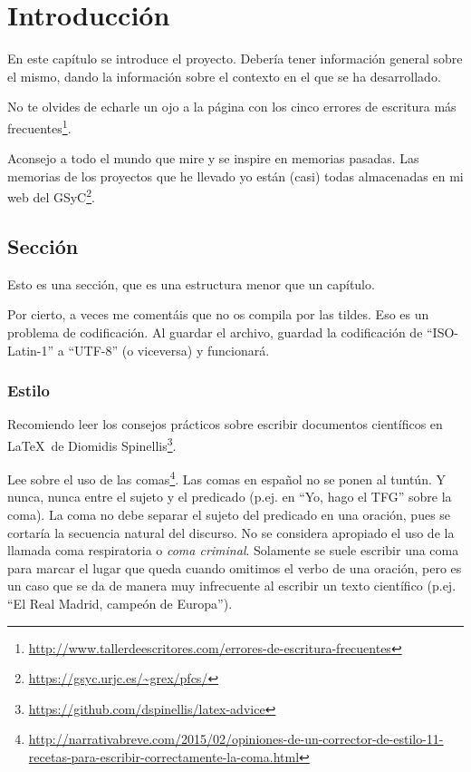 \documentclass[a4paper, 12pt]{book}
\begin{document}

\cleardoublepage
\chapter{Introducción}
\label{sec:intro} %
En este capítulo se introduce el proyecto.
Debería tener información general sobre el mismo, dando la información sobre el contexto en el que se ha desarrollado.

No te olvides de echarle un ojo a la página con los cinco errores de escritura más frecuentes\footnote{\url{http://www.tallerdeescritores.com/errores-de-escritura-frecuentes}}.

Aconsejo a todo el mundo que mire y se inspire en memorias pasadas.
Las memorias de los proyectos que he llevado yo están (casi) todas almacenadas en mi web del GSyC\footnote{\url{https://gsyc.urjc.es/~grex/pfcs/}}.

\section{Sección}
\label{sec:seccion}

Esto es una sección, que es una estructura menor que un capítulo. 

Por cierto, a veces me comentáis que no os compila por las tildes.
Eso es un problema de codificación.
Al guardar el archivo, guardad la codificación de ``ISO-Latin-1'' a ``UTF-8'' (o viceversa) y funcionará.

\subsection{Estilo}
\label{subsec:estilo}

Recomiendo leer los consejos prácticos sobre escribir documentos científicos en \LaTeX \ de Diomidis Spinellis\footnote{\url{https://github.com/dspinellis/latex-advice}}.

Lee sobre el uso de las comas\footnote{\url{http://narrativabreve.com/2015/02/opiniones-de-un-corrector-de-estilo-11-recetas-para-escribir-correctamente-la-coma.html}}. 
Las comas en español no se ponen al tuntún.
Y nunca, nunca entre el sujeto y el predicado (p.ej. en ``Yo, hago el TFG'' sobre la coma).
La coma no debe separar el sujeto del predicado en una oración, pues se cortaría la secuencia natural del discurso.
No se considera apropiado el uso de la llamada coma respiratoria o \emph{coma criminal}.
Solamente se suele escribir una coma para marcar el lugar que queda cuando omitimos el verbo de una oración, pero es un caso que se da de manera muy infrecuente al escribir un texto científico (p.ej. ``El Real Madrid, campeón de Europa'').
\end{document}
